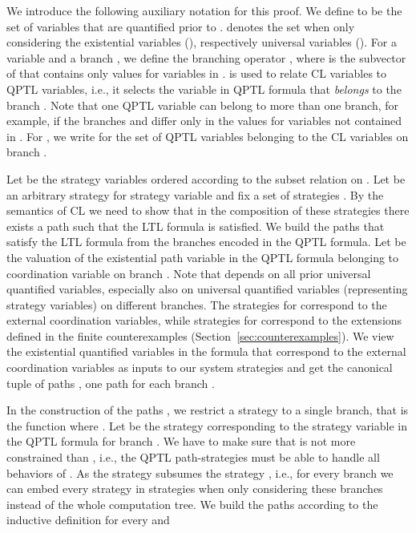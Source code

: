 \documentclass{LMCS}
\theoremstyle{plain}\newtheorem{theorem}[thm]{Theorem}
\theoremstyle{plain}\newtheorem{lemma}[thm]{Lemma}
\theoremstyle{plain}\newtheorem{proposition}[thm]{Proposition}
\theoremstyle{plain}\newtheorem{corollary}[thm]{Corollary}
\theoremstyle{definition}\newtheorem{definition}{Definition}[section]
\begin{document}
  We introduce the following auxiliary notation for this proof.
  We define  to be the set of variables that are quantified prior to .
   denotes the set  when only considering the existential variables (), respectively universal variables ().
  For a variable  and a branch , we define the branching operator , where  is the subvector of  that contains only values for variables in .
   is used to relate CL variables to QPTL variables, i.e., it selects the variable in QPTL formula that \emph{belongs} to the branch .
  Note that one QPTL variable can belong to more than one branch, for example,  if the branches  and  differ only in the values for variables not contained in .
  For , we write  for the set of QPTL variables belonging to the CL variables  on branch .


  Let  be the strategy variables  ordered according to the subset relation on .
  Let  be an arbitrary strategy for strategy variable  and fix a set of strategies .
  By the semantics of CL we need to show that in the composition of these strategies  there exists a path such that the LTL formula  is satisfied.
  We build the paths that satisfy the LTL formula from the branches  encoded in the QPTL formula.
  Let  be the valuation of the existential path variable in the QPTL formula belonging to coordination variable  on branch .
  Note that  depends on all prior universal quantified variables, especially also on universal quantified variables (representing strategy variables) on different branches.
  The strategies  for  correspond to the external coordination variables, while strategies  for  correspond to the extensions defined in the finite counterexamples (Section~\ref{sec:counterexamples}).
  We view the existential quantified variables in the formula that correspond to the external coordination variables as inputs to our system strategies  and get the canonical tuple of paths , one path  for each branch .
        
  In the construction of the paths , we restrict a strategy  to a single branch, that is the function  where .
  Let  be the strategy corresponding to the strategy variable  in the QPTL formula for branch .
  We have to make sure that  is not more constrained than , i.e., the QPTL path-strategies  must be able to handle all behaviors of .
  As  the strategy  subsumes the strategy , i.e., for every branch  we can embed every strategy  in strategies  when only considering these branches instead of the whole computation tree.
  We build the paths  according to the inductive definition for every  and 
  
\end{document}
